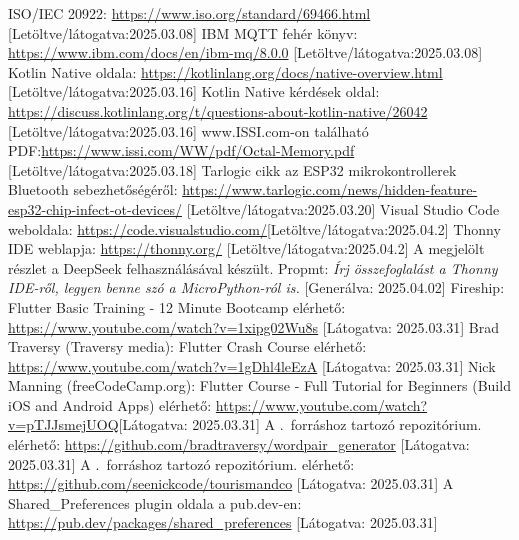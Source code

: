 \documentclass{thesis-ekf}
\theoremstyle{definition}
\theoremstyle{remark}
\begin{document}
\begin{thebibliography}{8}
	 ISO/IEC 20922: \url{https://www.iso.org/standard/69466.html}
	[Letöltve/látogatva:2025.03.08]
	 IBM MQTT fehér könyv: \url{https://www.ibm.com/docs/en/ibm-mq/8.0.0}
	[Letöltve/látogatva:2025.03.08]
	 Kotlin Native oldala: \url{https://kotlinlang.org/docs/native-overview.html}
	[Letöltve/látogatva:2025.03.16]
	 Kotlin Native kérdések oldal: \url{https://discuss.kotlinlang.org/t/questions-about-kotlin-native/26042}
	[Letöltve/látogatva:2025.03.16]
	 www.ISSI.com-on található PDF:\url{https://www.issi.com/WW/pdf/Octal-Memory.pdf}
	 [Letöltve/látogatva:2025.03.18]
	 Tarlogic cikk az ESP32 mikrokontrollerek Bluetooth sebezhetőségéről: \url{https://www.tarlogic.com/news/hidden-feature-esp32-chip-infect-ot-devices/}
	[Letöltve/látogatva:2025.03.20]
	 Visual Studio Code weboldala: \url{https://code.visualstudio.com/}[Letöltve/látogatva:2025.04.2]
	 Thonny IDE weblapja: \url{https://thonny.org/}
	[Letöltve/látogatva:2025.04.2]
	 A megjelölt részlet a DeepSeek felhasználásával készült. Propmt: \textit{Írj összefoglalást a Thonny IDE-ről, legyen benne szó a MicroPython-ról is.}
	[Generálva: 2025.04.02]
	 Fireship: Flutter Basic Training - 12 Minute Bootcamp elérhető: \url{https://www.youtube.com/watch?v=1xipg02Wu8s}
	[Látogatva: 2025.03.31]
	 Brad Traversy (Traversy media): Flutter Crash Course elérhető: \url{https://www.youtube.com/watch?v=1gDhl4leEzA}
	[Látogatva: 2025.03.31]
	 Nick Manning (freeCodeCamp.org): Flutter Course - Full Tutorial for Beginners (Build iOS and Android Apps) elérhető: \url{https://www.youtube.com/watch?v=pTJJsmejUOQ}[Látogatva: 2025.03.31]
	 A \cite{bib_flutter_traversy}.~forráshoz tartozó repozitórium. elérhető: \url{https://github.com/bradtraversy/wordpair_generator}
	[Látogatva: 2025.03.31]
	 A \cite{bib_flutter_freecodecamp}.~forráshoz tartozó repozitórium. elérhető: \url{https://github.com/seenickcode/tourismandco}
	[Látogatva: 2025.03.31]
	 A Shared\_Preferences plugin oldala a pub.dev-en: \url{https://pub.dev/packages/shared_preferences}
	[Látogatva: 2025.03.31]
\end{thebibliography}
\end{document}
